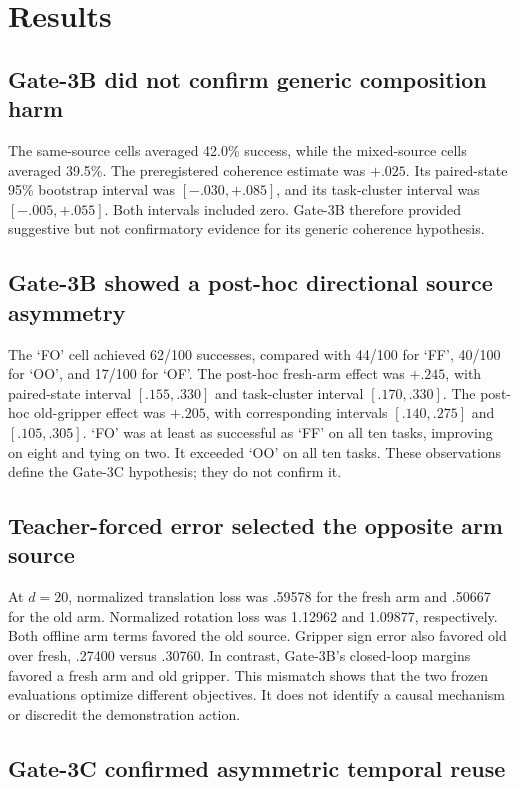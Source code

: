 \section{Results}

\subsection{Gate-3B did not confirm generic composition harm}

The same-source cells averaged 42.0\% success, while the mixed-source cells
averaged 39.5\%. The preregistered coherence estimate was $+.025$. Its
paired-state 95\% bootstrap interval was $[-.030,+.085]$, and its task-cluster
interval was $[-.005,+.055]$. Both intervals included zero. Gate-3B therefore
provided suggestive but not confirmatory evidence for its generic coherence
hypothesis.

\subsection{Gate-3B showed a post-hoc directional source asymmetry}

The `FO' cell achieved 62/100 successes, compared with 44/100 for `FF', 40/100
for `OO', and 17/100 for `OF'. The post-hoc fresh-arm effect was $+.245$, with
paired-state interval $[.155,.330]$ and task-cluster interval $[.170,.330]$.
The post-hoc old-gripper effect was $+.205$, with corresponding intervals
$[.140,.275]$ and $[.105,.305]$. `FO' was at least as successful as `FF' on all
ten tasks, improving on eight and tying on two. It exceeded `OO' on all ten
tasks. These observations define the Gate-3C hypothesis; they do not confirm
it.

\subsection{Teacher-forced error selected the opposite arm source}

At $d=20$, normalized translation loss was .59578 for the fresh arm and .50667
for the old arm. Normalized rotation loss was 1.12962 and 1.09877,
respectively. Both offline arm terms favored the old source. Gripper sign error
also favored old over fresh, .27400 versus .30760. In contrast, Gate-3B's
closed-loop margins favored a fresh arm and old gripper. This mismatch shows
that the two frozen evaluations optimize different objectives. It does not
identify a causal mechanism or discredit the demonstration action.

\subsection{Gate-3C confirmed asymmetric temporal reuse}

